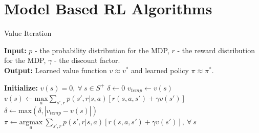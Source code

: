 \documentclass{article}
\begin{document}
\section{Model Based RL Algorithms}\label{sec:model_appendix}
\begin{algorithm}[H]
\caption{Value Iteration}\label{euclid}
\hspace*{\algorithmicindent} \textbf{Input:} $p$ - the probability distribution for the MDP, $r$ - the reward distribution for the MDP, $\gamma$ - the discount factor. \\
\hspace*{\algorithmicindent} \textbf{Output:} Learned value function $v \approx v^*$ and learned policy $\pi \approx \pi^*$.
\begin{algorithmic}[1]
\State \textbf{Initialize:} $v(s) = 0, \ \forall \ s \in S^+$
\State $\delta \gets 0$ 
\State $v_{temp} \gets v(s)$
\State $v(s) \gets \underset{a}{\text{max}} \sum_{s', r}p(s',r|s,a)[r(s,a,s') + \gamma v(s')]$
\State $\delta \gets \text{max}(\delta, |v_{temp} - v(s)|)$
\EndFor
\If{$\delta < \epsilon$}
\State {}
\EndIf
\EndWhile
\State $\pi \gets \underset{a}{\text{argmax}} \ \sum_{s',r} p(s',r|s,a)[r(s,a,s') + \gamma v(s')], \ \forall \ s$
\EndProcedure
\end{algorithmic}
\end{algorithm}
\end{document}
